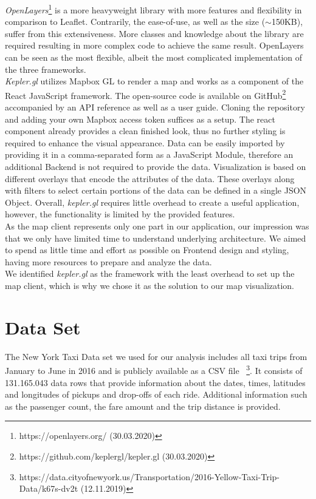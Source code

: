 \documentclass[sigconf, authorversion, nonacm=true]{acmart}
\begin{document}
\textit{OpenLayers}\footnote{https://openlayers.org/ (30.03.2020)} is a more heavyweight library with more features and flexibility in comparison to Leaflet. Contrarily, the ease-of-use, as well as the size ($\sim$150KB), suffer from this extensiveness. More classes and knowledge about the library are required resulting in more complex code to achieve the same result. OpenLayers can be seen as the most flexible, albeit the most complicated implementation of the three frameworks.\\


\textit{Kepler.gl} utilizes Mapbox GL to render a map and works as a component of the React JavaScript framework. The open-source code is available on GitHub\footnote{https://github.com/keplergl/kepler.gl (30.03.2020)} accompanied by an API reference as well as a user guide. Cloning the repository and adding your own Mapbox access token suffices as a setup. The react component already provides a clean finished look, thus no further styling is required to enhance the visual appearance.
Data can be easily imported by providing it in a comma-separated form as a JavaScript Module, therefore an additional Backend is not required to provide the data. Visualization is based on different overlays that encode the attributes of the data. These overlays along with filters to select certain portions of the data can be defined in a single JSON Object. 
Overall, \textit{kepler.gl} requires little overhead to create a useful application, however, the functionality is limited by the provided features.\\


As the map client represents only one part in our application, our impression was that we only have limited time to understand underlying architecture. We aimed to spend as little time and effort as possible on Frontend design and styling, having more resources to prepare and analyze the data.\\
We identified \textit{kepler.gl} as the framework with the least overhead to set up the map client, which is why we chose it as the solution to our map visualization. 




\section{Data Set}
\label{sec:data}

The New York Taxi Data set we used for our analysis includes all taxi trips from January to June in 2016 and is publicly available as a CSV file ~\footnote{https://data.cityofnewyork.us/Transportation/2016-Yellow-Taxi-Trip-Data/k67s-dv2t (12.11.2019)}. It consists of 131.165.043 data rows that provide information about the dates, times, latitudes and longitudes of pickups and drop-offs of each ride. Additional information such as the passenger count, the fare amount and the trip distance is provided. \\
\end{document}
